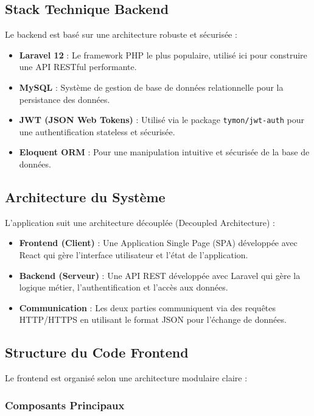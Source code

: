 \documentclass[12pt,a4paper]{report}
\begin{document}
\subsection{Stack Technique Backend}

Le backend est basé sur une architecture robuste et sécurisée :
\begin{itemize}
    \item \textbf{Laravel 12} : Le framework PHP le plus populaire, utilisé ici pour construire une API RESTful performante.
    \item \textbf{MySQL} : Système de gestion de base de données relationnelle pour la persistance des données.
    \item \textbf{JWT (JSON Web Tokens)} : Utilisé via le package \texttt{tymon/jwt-auth} pour une authentification stateless et sécurisée.
    \item \textbf{Eloquent ORM} : Pour une manipulation intuitive et sécurisée de la base de données.
\end{itemize}

\subsection{Architecture du Système}

L'application suit une architecture découplée (Decoupled Architecture) :
\begin{itemize}
    \item \textbf{Frontend (Client)} : Une Application Single Page (SPA) développée avec React qui gère l'interface utilisateur et l'état de l'application.
    \item \textbf{Backend (Serveur)} : Une API REST développée avec Laravel qui gère la logique métier, l'authentification et l'accès aux données.
    \item \textbf{Communication} : Les deux parties communiquent via des requêtes HTTP/HTTPS en utilisant le format JSON pour l'échange de données.
\end{itemize}

\subsection{Structure du Code Frontend}

Le frontend est organisé selon une architecture modulaire claire :

\subsubsection{Composants Principaux}
\end{document}
